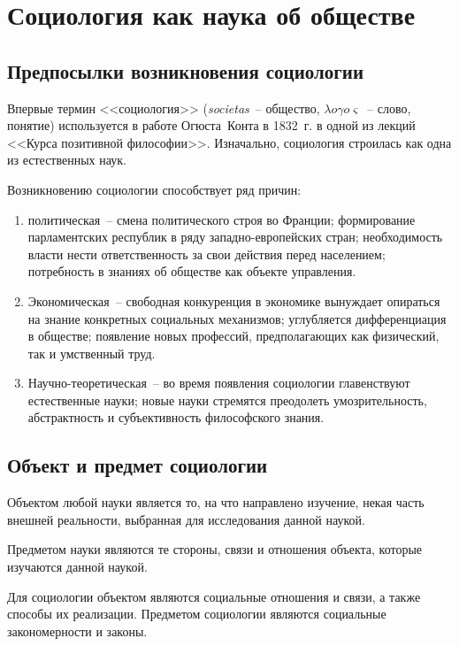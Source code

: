 \chapter{Социология как наука об обществе}
\section{Предпосылки возникновения социологии}

  Впервые термин <<социология>> (\emph{societas}~-- общество,
  \( \lambda o\gamma o\varsigma \)~-- слово, понятие) используется в работе
  Огюста~Конта в 1832~г. в одной из лекций <<Курса позитивной философии>>.
  Изначально, социология строилась как одна из естественных наук.

  Возникновению социологии способствует ряд причин:
  \begin{enumerate}
    \item политическая~-- смена политического строя во Франции; формирование
      парламентских республик в ряду западно-европейских стран; необходимость
      власти нести ответственность за свои действия перед населением;
      потребность в знаниях об обществе как объекте управления.
    \item Экономическая~-- свободная конкуренция в экономике вынуждает опираться
      на знание конкретных социальных механизмов; углубляется дифференциация в
      обществе; появление новых профессий, предполагающих как физический, так и
      умственный труд.
    \item Научно-теоретическая~-- во время появления социологии главенствуют
      естественные науки; новые науки стремятся преодолеть умозрительность,
      абстрактность и субъективность философского знания.
  \end{enumerate}

\section{Объект и предмет социологии}

  Объектом любой науки является то, на что направлено изучение, некая часть
  внешней реальности, выбранная для исследования данной наукой.

  Предметом науки являются те стороны, связи и отношения объекта, которые
  изучаются данной наукой.

  Для социологии объектом являются социальные отношения и связи, а также способы
  их реализации. Предметом социологии являются социальные закономерности и
  законы.

